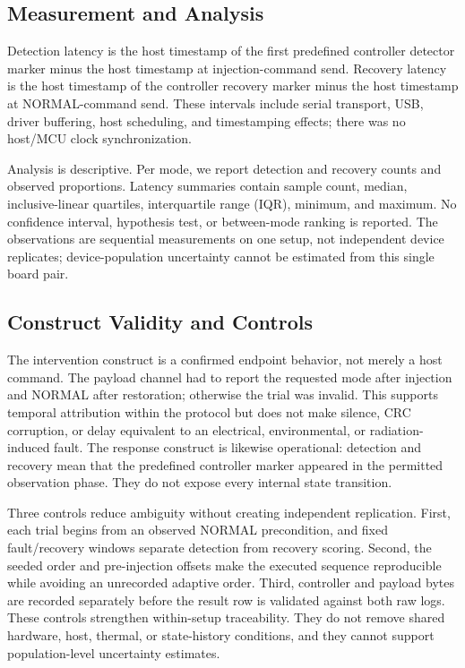 \documentclass[conference]{IEEEtran}
\begin{document}
\subsection{Measurement and Analysis}

Detection latency is the host timestamp of the first predefined controller detector marker minus the host timestamp at injection-command send. Recovery latency is the host timestamp of the controller recovery marker minus the host timestamp at NORMAL-command send. These intervals include serial transport, USB, driver buffering, host scheduling, and timestamping effects; there was no host/MCU clock synchronization.

Analysis is descriptive. Per mode, we report detection and recovery counts and observed proportions. Latency summaries contain sample count, median, inclusive-linear quartiles, interquartile range (IQR), minimum, and maximum. No confidence interval, hypothesis test, or between-mode ranking is reported. The observations are sequential measurements on one setup, not independent device replicates; device-population uncertainty cannot be estimated from this single board pair.

\subsection{Construct Validity and Controls}

The intervention construct is a confirmed endpoint behavior, not merely a host command. The payload channel had to report the requested mode after injection and NORMAL after restoration; otherwise the trial was invalid. This supports temporal attribution within the protocol but does not make silence, CRC corruption, or delay equivalent to an electrical, environmental, or radiation-induced fault. The response construct is likewise operational: detection and recovery mean that the predefined controller marker appeared in the permitted observation phase. They do not expose every internal state transition.

Three controls reduce ambiguity without creating independent replication. First, each trial begins from an observed NORMAL precondition, and fixed fault/recovery windows separate detection from recovery scoring. Second, the seeded order and pre-injection offsets make the executed sequence reproducible while avoiding an unrecorded adaptive order. Third, controller and payload bytes are recorded separately before the result row is validated against both raw logs. These controls strengthen within-setup traceability. They do not remove shared hardware, host, thermal, or state-history conditions, and they cannot support population-level uncertainty estimates.
\end{document}
